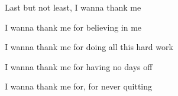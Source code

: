 

Last but not least, I wanna thank me

I wanna thank me for believing in me

I wanna thank me for doing all this hard work

I wanna thank me for having no days off

I wanna thank me for, for never quitting